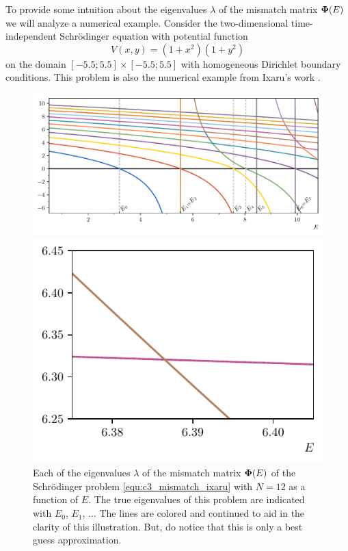 To provide some intuition about the eigenvalues $\lambda$ of the mismatch matrix $\vb{\Phi}(E)$ we will analyze a numerical example. Consider the two-dimensional time-independent Schrödinger equation with potential function
\begin{equation}\label{equ:c3_mismatch_ixaru}
  V(x, y) = (1+x^2)(1+y^2)
\end{equation}
on the domain $[-5.5; 5.5] \times [-5.5; 5.5]$ with homogeneous Dirichlet boundary conditions. This problem is also the numerical example from Ixaru's work \cite{ixaru_new_2010}.

\begin{figure}
  \begin{center}
    \includegraphics[width=\textwidth]{img/chapter3/mismatch_rainbow.pdf}
  \end{center}
  \caption{Each of the eigenvalues $\lambda$ of the mismatch matrix $\vb{\Phi}(E)$ of the Schrödinger problem \eqref{equ:c3_mismatch_ixaru} with $N = 12$ as a function of $E$. The true eigenvalues of this problem are indicated with $E_0$, $E_1$, $\dots$ The lines are colored and continued to aid in the clarity of this illustration. But, do notice that this is only a best guess approximation.}\label{fig:c3_mismatch_rainbow}
  \vspace{1cm}
  \begin{center}
    \includegraphics[width=.495\textwidth]{img/chapter3/mismatch_rainbow_zoomed_0.pdf}

\end{center}
\end{figure}

